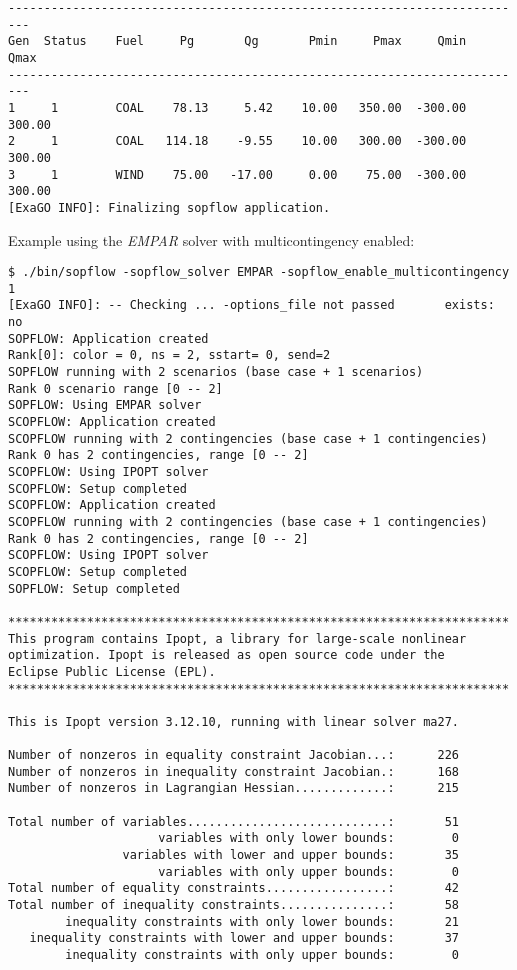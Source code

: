 \begin{lstlisting}
-------------------------------------------------------------------------
Gen  Status    Fuel     Pg       Qg       Pmin     Pmax     Qmin     Qmax
-------------------------------------------------------------------------
1     1        COAL    78.13     5.42    10.00   350.00  -300.00   300.00
2     1        COAL   114.18    -9.55    10.00   300.00  -300.00   300.00
3     1        WIND    75.00   -17.00     0.00    75.00  -300.00   300.00
[ExaGO INFO]: Finalizing sopflow application.
\end{lstlisting}

Example using the \emph{EMPAR} solver with multicontingency enabled:

\begin{lstlisting}
$ ./bin/sopflow -sopflow_solver EMPAR -sopflow_enable_multicontingency 1
[ExaGO INFO]: -- Checking ... -options_file not passed       exists: no
SOPFLOW: Application created
Rank[0]: color = 0, ns = 2, sstart= 0, send=2
SOPFLOW running with 2 scenarios (base case + 1 scenarios)
Rank 0 scenario range [0 -- 2]
SOPFLOW: Using EMPAR solver
SCOPFLOW: Application created
SCOPFLOW running with 2 contingencies (base case + 1 contingencies)
Rank 0 has 2 contingencies, range [0 -- 2]
SCOPFLOW: Using IPOPT solver
SCOPFLOW: Setup completed
SCOPFLOW: Application created
SCOPFLOW running with 2 contingencies (base case + 1 contingencies)
Rank 0 has 2 contingencies, range [0 -- 2]
SCOPFLOW: Using IPOPT solver
SCOPFLOW: Setup completed
SOPFLOW: Setup completed

**********************************************************************
This program contains Ipopt, a library for large-scale nonlinear 
optimization. Ipopt is released as open source code under the 
Eclipse Public License (EPL).
**********************************************************************

This is Ipopt version 3.12.10, running with linear solver ma27.

Number of nonzeros in equality constraint Jacobian...:      226
Number of nonzeros in inequality constraint Jacobian.:      168
Number of nonzeros in Lagrangian Hessian.............:      215

Total number of variables............................:       51
                     variables with only lower bounds:        0
                variables with lower and upper bounds:       35
                     variables with only upper bounds:        0
Total number of equality constraints.................:       42
Total number of inequality constraints...............:       58
        inequality constraints with only lower bounds:       21
   inequality constraints with lower and upper bounds:       37
        inequality constraints with only upper bounds:        0


\end{lstlisting}
